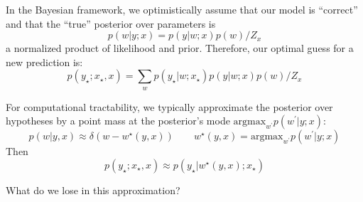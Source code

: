 
        In the Bayesian framework, we optimistically assume that our model is
        ``correct'' and that the ``true'' posterior over parameters is
        $$
            p(w|y;x) = p(y|w;x) p(w) / Z_x
        $$
        a normalized product of likelihood and prior.
        Therefore, our optimal guess for a new prediction is:
        $$
            p(y_\star;x_\star, x)
            = \sum_w p(y_\star|w;x_\star) p(y|w;x) p(w) / Z_x
        $$

        For computational tractability, we typically approximate the posterior
        over hypotheses by a point mass at the posterior's mode
        $\text{argmax}_{w^\prime} p(w^\prime|y;x)$:
        $$
            p(w|y,x) \approx \delta(w - w^\star(y,x))
            \quad\quad
            w^\star(y,x)=\text{argmax}_{w^\prime} p(w^\prime|y;x)
        $$
        Then
        $$
            p(y_\star;x_\star, x)
            \approx p(y_\star|w^\star(y,x);x_\star)
        $$

        What do we lose in this approximation?










